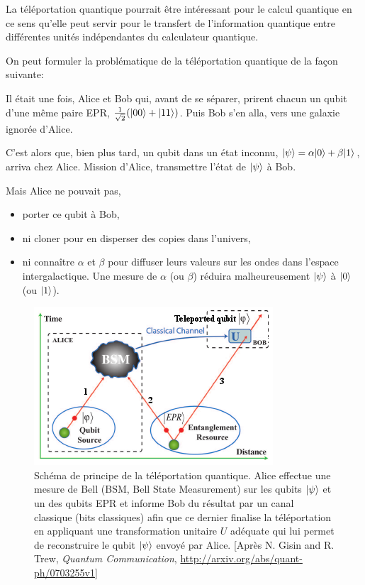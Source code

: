La téléportation quantique pourrait être intéressant pour le calcul quantique en
ce sens qu'elle peut servir pour le transfert de l'information quantique entre
différentes unités indépendantes du calculateur quantique.

On peut formuler la problématique de la téléportation quantique de la façon
suivante:
\begin{problem}
Il était une fois, Alice et Bob qui, avant de se séparer, prirent chacun un
qubit d'une même paire EPR, $\frac{1}{\sqrt{2}}(\vert00\rangle +\vert11\rangle )$. Puis Bob
s'en alla, vers une galaxie ignorée d'Alice.

C'est alors que, bien plus tard, un qubit dans un état inconnu, $\vert\psi\rangle
=\alpha\vert0\rangle+\beta\vert1\rangle$, arriva chez Alice. Mission d'Alice, transmettre
l'état de $\vert\psi\rangle$ à Bob.

Mais Alice ne pouvait pas,

\begin{itemize}
\item porter ce qubit à Bob,

\item ni cloner pour en disperser des copies dans l'univers,

\item ni connaître $\alpha$ et $\beta$ pour diffuser leurs valeurs sur les
ondes dans l'espace intergalactique. Une mesure de $\alpha$ (ou $\beta$)
réduira malheureusement $\vert\psi\rangle$ à $\vert0\rangle$ (ou $\vert1\rangle $).
\end{itemize}
\end{problem}

\begin{figure}[ptbh]
\centering
	\includegraphics{graphics/Teleportation.png}%
\caption{Schéma de principe de la téléportation quantique. Alice effectue une
mesure de Bell (BSM, Bell State Measurement) sur les qubits $\vert\psi\rangle$ et un
des qubits EPR et informe Bob du résultat par un canal classique (bits
classiques) afin que ce dernier finalise la téléportation en appliquant une
transformation unitaire $U$ adéquate qui lui permet de reconstruire le qubit
$\vert\psi\rangle$ envoyé par Alice. [Après N. Gisin and R. Trew, \emph{Quantum
Communication}, \url{http://arxiv.org/abs/quant-ph/0703255v1}]}%
\label{fig:teleportation}%
\end{figure}

